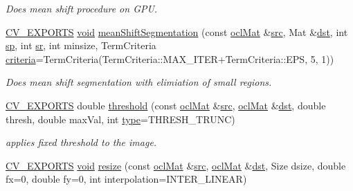 \begin{DoxyCompactItemize}
\begin{DoxyCompactList}\small\item\em Does mean shift procedure on G\-P\-U. \end{DoxyCompactList}\item 
\hyperlink{core_2types__c_8h_a1bf9f0e121b54272da02379cfccd0a2b}{C\-V\-\_\-\-E\-X\-P\-O\-R\-T\-S} \hyperlink{legacy_8hpp_a8bb47f092d473522721002c86c13b94e}{void} \hyperlink{namespacecv_1_1ocl_ae45d9074fec046e0f36335d0cd1b95ff}{mean\-Shift\-Segmentation} (const \hyperlink{classcv_1_1ocl_1_1oclMat}{ocl\-Mat} \&\hyperlink{legacy_8hpp_a371cd109b74033bc4366f584edd3dacc}{src}, Mat \&\hyperlink{photo__c_8h_aed13e2a25279b24dc954073233fef7a5}{dst}, int \hyperlink{imgproc__c_8h_ac14bc2e984efdff6b1fa7e106f3ac14a}{sp}, int \hyperlink{imgproc__c_8h_acecaf9a0f96f944ff768b10358b45839}{sr}, int minsize, Term\-Criteria \hyperlink{tracking_8hpp_ac10fcea99ab081e745366c6f5bbc8eb5}{criteria}=Term\-Criteria(Term\-Criteria\-::\-M\-A\-X\-\_\-\-I\-T\-E\-R+Term\-Criteria\-::\-E\-P\-S, 5, 1))
\begin{DoxyCompactList}\small\item\em Does mean shift segmentation with elimiation of small regions. \end{DoxyCompactList}\item 
\hyperlink{core_2types__c_8h_a1bf9f0e121b54272da02379cfccd0a2b}{C\-V\-\_\-\-E\-X\-P\-O\-R\-T\-S} double \hyperlink{namespacecv_1_1ocl_a91ad85261d1cc9212bd7a3e83eacb2c3}{threshold} (const \hyperlink{classcv_1_1ocl_1_1oclMat}{ocl\-Mat} \&\hyperlink{legacy_8hpp_a371cd109b74033bc4366f584edd3dacc}{src}, \hyperlink{classcv_1_1ocl_1_1oclMat}{ocl\-Mat} \&\hyperlink{photo__c_8h_aed13e2a25279b24dc954073233fef7a5}{dst}, double thresh, double max\-Val, int \hyperlink{imgproc__c_8h_a84612d8738bf935200cf32a103d8efe1}{type}=T\-H\-R\-E\-S\-H\-\_\-\-T\-R\-U\-N\-C)
\begin{DoxyCompactList}\small\item\em applies fixed threshold to the image. \end{DoxyCompactList}\item 
\hyperlink{core_2types__c_8h_a1bf9f0e121b54272da02379cfccd0a2b}{C\-V\-\_\-\-E\-X\-P\-O\-R\-T\-S} \hyperlink{legacy_8hpp_a8bb47f092d473522721002c86c13b94e}{void} \hyperlink{namespacecv_1_1ocl_a377076c1a2ba95a4dfc9c9954b13a219}{resize} (const \hyperlink{classcv_1_1ocl_1_1oclMat}{ocl\-Mat} \&\hyperlink{legacy_8hpp_a371cd109b74033bc4366f584edd3dacc}{src}, \hyperlink{classcv_1_1ocl_1_1oclMat}{ocl\-Mat} \&\hyperlink{photo__c_8h_aed13e2a25279b24dc954073233fef7a5}{dst}, Size dsize, double fx=0, double fy=0, int interpolation=I\-N\-T\-E\-R\-\_\-\-L\-I\-N\-E\-A\-R)

\end{DoxyCompactItemize}
